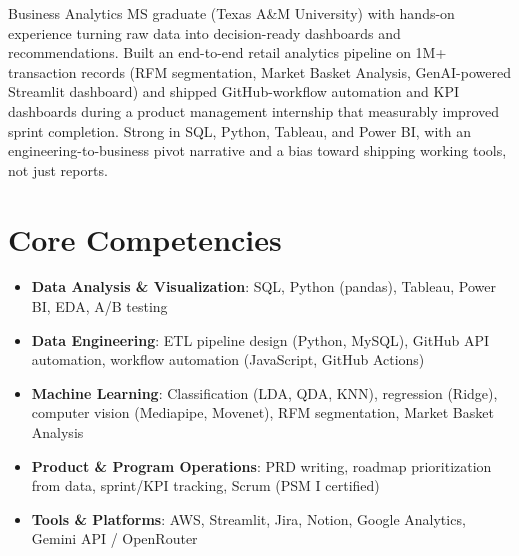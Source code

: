 \documentclass[11pt,a4paper,sans]{moderncv}
\begin{document}
\makecvtitle


\vspace{6pt}
\small{Business Analytics MS graduate (Texas A\&M University) with hands-on experience turning raw data into decision-ready dashboards and recommendations. Built an end-to-end retail analytics pipeline on 1M+ transaction records (RFM segmentation, Market Basket Analysis, GenAI-powered Streamlit dashboard) and shipped GitHub-workflow automation and KPI dashboards during a product management internship that measurably improved sprint completion. Strong in SQL, Python, Tableau, and Power BI, with an engineering-to-business pivot narrative and a bias toward shipping working tools, not just reports.}


\section{Core Competencies}
\vspace{1pt}
\begin{itemize}

\item \textbf{Data Analysis \& Visualization}: SQL, Python (pandas), Tableau, Power BI, EDA, A/B testing

\item \textbf{Data Engineering}: ETL pipeline design (Python, MySQL), GitHub API automation, workflow automation (JavaScript, GitHub Actions)

\item \textbf{Machine Learning}: Classification (LDA, QDA, KNN), regression (Ridge), computer vision (Mediapipe, Movenet), RFM segmentation, Market Basket Analysis

\item \textbf{Product \& Program Operations}: PRD writing, roadmap prioritization from data, sprint/KPI tracking, Scrum (PSM I certified)

\item \textbf{Tools \& Platforms}: AWS, Streamlit, Jira, Notion, Google Analytics, Gemini API / OpenRouter

\end{itemize}
\end{document}
